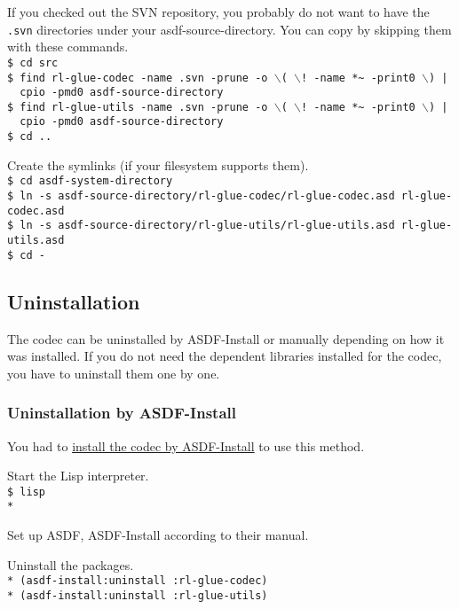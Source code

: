 \documentclass[11pt,a4paper,dvipdfm]{article}
\newcommand{\prompttext}[1]{\texttt{#1}}
\newcommand{\shprompt}[1]{\prompttext{\$ #1}}
\newcommand{\lispprompt}[1]{\prompttext{* #1}}
\begin{document}
If you checked out the SVN repository, you probably do not want to have the
\prompttext{.svn} directories under your asdf-source-directory. You can
copy by skipping them with these commands. \\
\shprompt{cd src} \\
\shprompt{find rl-glue-codec -name .svn -prune
          -o $\backslash$( $\backslash$!~-name *\~{} -print0 $\backslash$) | \\
\mbox{~~}cpio -pmd0 asdf-source-directory} \\
\shprompt{find rl-glue-utils -name .svn -prune
          -o $\backslash$( $\backslash$!~-name *\~{} -print0 $\backslash$) | \\
\mbox{~~}cpio -pmd0 asdf-source-directory} \\
\shprompt{cd ..}

Create the symlinks (if your filesystem supports them). \\
\shprompt{cd asdf-system-directory} \\
\shprompt{ln -s asdf-source-directory/rl-glue-codec/rl-glue-codec.asd
          rl-glue-codec.asd} \\
\shprompt{ln -s asdf-source-directory/rl-glue-utils/rl-glue-utils.asd
          rl-glue-utils.asd} \\
\shprompt{cd -}

\subsection{Uninstallation}

The codec can be uninstalled by ASDF-Install or manually depending on how
it was installed.  If you do not need the dependent libraries installed for
the codec, you have to uninstall them one by one.

\subsubsection{Uninstallation by ASDF-Install}

You had to \hyperlink{asdfinst}{install the codec by ASDF-Install} to use this
method.

Start the Lisp interpreter. \\
\shprompt{lisp} \\
\lispprompt{}

Set up ASDF, ASDF-Install according to their manual.

Uninstall the packages. \\
\lispprompt{(asdf-install:uninstall :rl-glue-codec)} \\
\lispprompt{(asdf-install:uninstall :rl-glue-utils)}
\end{document}
